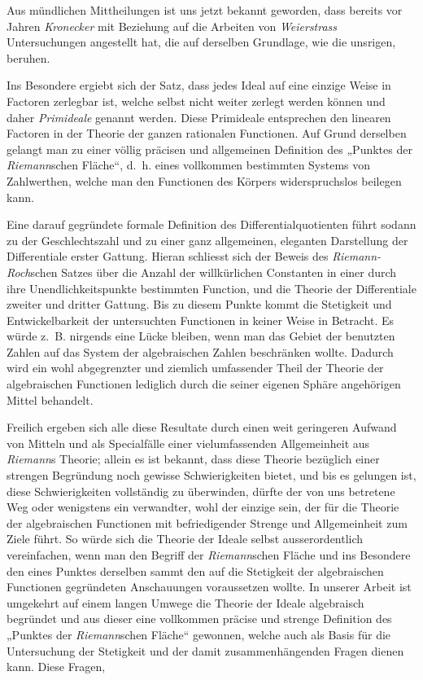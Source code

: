\documentclass{article}
\begin{document}
Aus mündlichen Mittheilungen ist uns jetzt bekannt geworden, dass bereits vor Jahren \emph{Kronecker} mit Beziehung auf die Arbeiten von \emph{Weierstrass} Untersuchungen angestellt hat, die auf derselben Grundlage, wie die unsrigen, beruhen.

Ins Besondere ergiebt sich der Satz, dass jedes Ideal auf eine einzige Weise in Factoren zerlegbar ist, welche selbst nicht weiter zerlegt werden können und daher \emph{Primideale} genannt werden. Diese Primideale entsprechen den linearen Factoren in der Theorie der ganzen rationalen Functionen. Auf Grund derselben gelangt man zu einer völlig präcisen und allgemeinen Definition des „Punktes der \emph{Riemann}schen Fläche“, d.\ h. eines vollkommen bestimmten Systems von Zahlwerthen, welche man den Functionen des Körpers widerspruchslos beilegen kann.

Eine darauf gegründete formale Definition des Differentialquotienten führt sodann zu der Geschlechtszahl und zu einer ganz allgemeinen, eleganten Darstellung der Differentiale erster Gattung. Hieran schliesst sich der Beweis des \emph{Riemann-Roch}schen Satzes über die Anzahl der willkürlichen Constanten in einer durch ihre Unendlichkeitspunkte bestimmten Function, und die Theorie der Differentiale zweiter und dritter Gattung. Bis zu diesem Punkte kommt die Stetigkeit und Entwickelbarkeit der untersuchten Functionen in keiner Weise in Betracht. Es würde z.\ B. nirgends eine Lücke bleiben, wenn man das Gebiet der benutzten Zahlen auf das System der algebraischen Zahlen beschränken wollte. Dadurch wird ein wohl abgegrenzter und ziemlich umfassender Theil der Theorie der algebraischen Functionen lediglich durch die seiner eigenen Sphäre angehörigen Mittel behandelt.

Freilich ergeben sich alle diese Resultate durch einen weit geringeren Aufwand von Mitteln und als Specialfälle einer vielumfassenden Allgemeinheit aus \emph{Riemann}s Theorie; allein es ist bekannt, dass diese Theorie bezüglich einer strengen Begründung noch gewisse Schwierigkeiten bietet, und bis es gelungen ist, diese Schwierigkeiten vollständig zu überwinden, dürfte der von uns betretene Weg oder wenigstens ein verwandter, wohl der einzige sein, der für die Theorie der algebraischen Functionen mit befriedigender Strenge und Allgemeinheit zum Ziele führt. So würde sich die Theorie der Ideale selbst ausserordentlich vereinfachen, wenn man den Begriff der \emph{Riemann}schen Fläche und ins Besondere den eines Punktes derselben sammt den auf die Stetigkeit der algebraischen Functionen gegründeten Anschauungen voraussetzen wollte. In unserer Arbeit ist umgekehrt auf einem langen Umwege die Theorie der Ideale algebraisch begründet und aus dieser eine vollkommen präcise und strenge Definition des „Punktes der \emph{Riemann}schen Fläche“ gewonnen, welche auch als Basis für die Untersuchung der Stetigkeit und der damit zusammenhängenden Fragen dienen kann. Diese Fragen,
\end{document}
